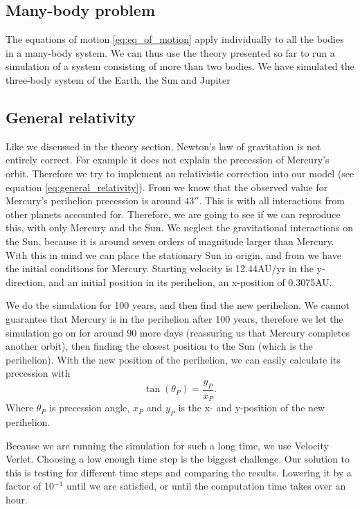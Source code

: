 \documentclass[reprint, english,notitlepage,nofootinbib]{revtex4-1}  %
\begin{document}
\subsection{Many-body problem}

The equations of motion \eqref{eq:eq_of_motion} apply individually to all the bodies in a many-body system. We can thus use the theory presented so far to run a simulation of a system consisting of more than two bodies. We have simulated the three-body system of the Earth, the Sun and Jupiter 


\subsection{General relativity}

Like we discussed in the theory section, Newton's law of gravitation is not entirely correct. For example it does not explain the precession of Mercury's orbit. Therefore we try to implement an relativistic correction into our model (see equation \eqref{eq:general_relativity}). From \citep{oppgavetekst} we know that the observed value for Mercury's perihelion precession is around $43''$. This is with all interactions from other planets accounted for. Therefore, we are going to see if we can reproduce this, with only Mercury and the Sun. We neglect the gravitational interactions on the Sun, because it is around seven orders of magnitude larger than Mercury. With this in mind we can place the stationary Sun in origin, and from \citep{oppgavetekst} we have the initial conditions for Mercury. Starting velocity is 12.44AU/yr in the y-direction, and an initial position in its perihelion, an x-position of 0.3075AU.

We do the simulation for 100 years, and then find the new perihelion. We cannot guarantee that Mercury is in the perihelion after 100 years, therefore we let the simulation go on for around 90 more days (reassuring us that Mercury completes another orbit), then finding the closest position to the Sun (which is the perihelion). With the new position of the perihelion, we can easily calculate its precession with
\begin{equation*}
	\tan(\theta_P) = \frac{y_P}{x_P}.
\end{equation*}
Where $\theta_P$ is precession angle, $x_P$ and $y_P$ is the x- and y-position of the new perihelion.

Because we are running the simulation for such a long time, we use Velocity Verlet. Choosing a low enough time step is the biggest challenge. Our solution to this is testing for different time steps and comparing the results. Lowering it by a factor of 10$^{-1}$ until we are satisfied, or until the computation time takes over an hour.
\end{document}

